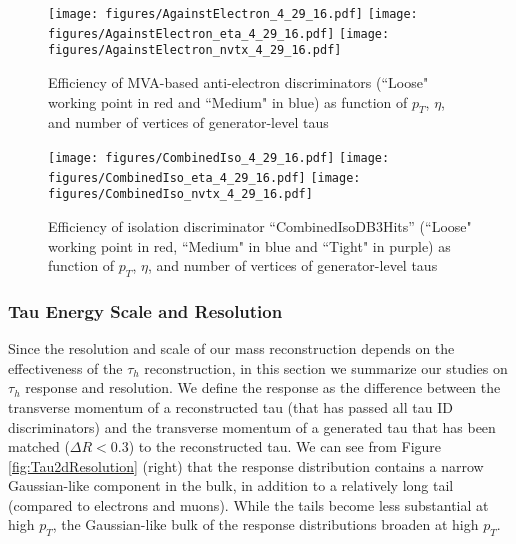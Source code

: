 \begin{figure}[tbh!]
    \centering
   
      \texttt{[image: figures/AgainstElectron\_4\_29\_16.pdf]}
      \texttt{[image: figures/AgainstElectron\_eta\_4\_29\_16.pdf]}
       \texttt{[image: figures/AgainstElectron\_nvtx\_4\_29\_16.pdf]}

    \caption{Efficiency of MVA-based anti-electron discriminators (``Loose" working point in red and ``Medium" in blue) as function of $p_{T}$, $\eta$, and number of vertices of generator-level taus }
    \label{fig:EM5}
  \end{figure}

\begin{figure}[tbh!]
    \centering
    
      \texttt{[image: figures/CombinedIso\_4\_29\_16.pdf]}
      \texttt{[image: figures/CombinedIso\_eta\_4\_29\_16.pdf]}
       \texttt{[image: figures/CombinedIso\_nvtx\_4\_29\_16.pdf]}
    
    \caption{Efficiency of isolation discriminator ``CombinedIsoDB3Hits'' (``Loose" working point in red,  ``Medium" in blue and ``Tight" in purple) as function of $p_{T}$, $\eta$, and number of vertices of generator-level taus }
    \label{fig:TIso}
  \end{figure}



\subsubsection{Tau Energy Scale and Resolution}

Since the resolution and scale of our mass reconstruction depends on the effectiveness of the $\tau_{h}$ reconstruction, in this section we summarize our studies on $\tau_{h}$ response and resolution. We define the response as the difference between the transverse momentum of a reconstructed tau (that has passed all tau ID discriminators) and the transverse momentum of a generated tau that has been matched ($\Delta R < 0.3$) to the reconstructed tau. We can see from Figure \ref{fig:Tau2dResolution} (right) that the response distribution contains a narrow Gaussian-like component in the bulk, in addition to a relatively long tail (compared to electrons and muons). While the tails become less substantial at high $p_{T}$, the Gaussian-like bulk of the response distributions broaden at high $p_{T}$.
 
